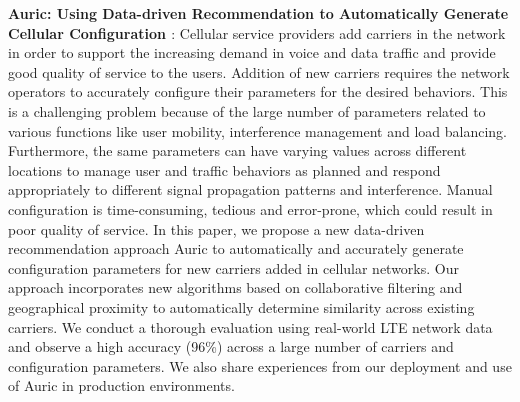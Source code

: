 \textbf{Auric: Using Data-driven Recommendation to Automatically Generate Cellular Configuration \cite{Mahimkar2021}}: Cellular service providers add carriers in the network in order to support the increasing demand in voice and data traffic and provide good quality of service to the users. Addition of new carriers requires the network operators to accurately configure their parameters for the desired behaviors. This is a challenging problem because of the large number of parameters related to various functions like user mobility, interference management and load balancing. Furthermore, the same parameters can have varying values across different locations to manage user and traffic behaviors as planned and respond appropriately to different signal propagation patterns and interference. Manual configuration is time-consuming, tedious and error-prone, which could result in poor quality of service. In this paper, we propose a new data-driven recommendation approach Auric to automatically and accurately generate configuration parameters for new carriers added in cellular networks. Our approach incorporates new algorithms based on collaborative filtering and geographical proximity to automatically determine similarity across existing carriers. We conduct a thorough evaluation using real-world LTE network data and observe a high accuracy (96\%) across a large number of carriers and configuration parameters. We also share experiences from our deployment and use of Auric in production environments.\\

